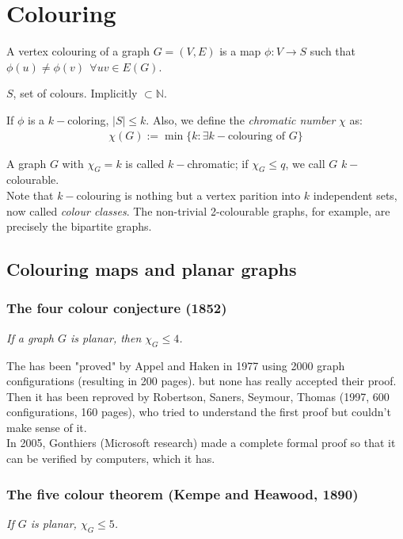 
\chapter{Colouring}
A vertex colouring of a graph $G = (V,E)$ is a map $\phi: V \rightarrow S$ such that $\phi(u) \neq \phi(v) ~~\forall uv \in E(G)$.

$S$, set of colours. Implicitly $\subset \mathbb{N}$.

\bigskip
If $\phi$ is a $k-$coloring, $|S| \leq k$. Also, we define the \textit{chromatic number} $\chi$ as:
\begin{eqnarray}
	\chi (G) := \min \{ k : \exists k-\text{colouring of }G \}
\end{eqnarray}

A graph $G$ with $\chi_{G} = k$ is called $k-$chromatic; if $\chi_{G} \leq q$, we call $G$ $k-$colourable.\\

Note that $k-$colouring is nothing but a vertex parition into $k$ independent sets, now called \textit{colour classes}. The non-trivial 2-colourable graphs, for example, are precisely the bipartite graphs.

	\section{Colouring maps and planar graphs}
		\subsection{The four colour conjecture (1852)}
		\textit{If a graph $G$ is planar, then $\chi_{G} \leq 4$.	\\}
		
		The has been "proved" by Appel and Haken in 1977 using 2000 graph configurations (resulting in 200 pages). but none has really accepted their proof. \\
		
		Then it has been reproved by Robertson, Saners, Seymour, Thomas (1997, 600 configurations, 160 pages), who tried to understand the first proof but couldn't make sense of it. \\
		
		In 2005, Gonthiers (Microsoft research) made a complete formal proof so that it can be verified by computers, which it has.
		
		\subsection{The five colour theorem (Kempe and Heawood, 1890)}
		\textit{If $G$ is planar, $\chi_{G} \leq 5$.\\}
		
